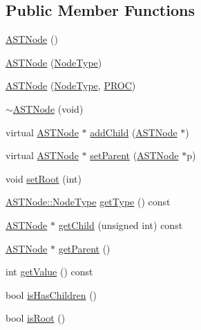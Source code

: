 \subsection*{Public Member Functions}
\begin{DoxyCompactItemize}
\item 
\hyperlink{class_a_s_t_node_a1196ed4f19c0b62cdc42fe35946b91d2}{A\-S\-T\-Node} ()
\item 
\hyperlink{class_a_s_t_node_a512c4363de4ceef82b6189e1dbd34ec1}{A\-S\-T\-Node} (\hyperlink{class_a_s_t_node_a4fd016b5f0e44ea6aca3542d27de3859}{Node\-Type})
\item 
\hyperlink{class_a_s_t_node_a97d3345ffb311a0582a8bf1478722a70}{A\-S\-T\-Node} (\hyperlink{class_a_s_t_node_a4fd016b5f0e44ea6aca3542d27de3859}{Node\-Type}, \hyperlink{std_afx_8h_aa07ea1d188c7b45668f1bd82ffd6d87e}{P\-R\-O\-C})
\item 
\hyperlink{class_a_s_t_node_a075d226c6382610b649193f72902faf7}{$\sim$\-A\-S\-T\-Node} (void)
\item 
virtual \hyperlink{class_a_s_t_node}{A\-S\-T\-Node} $\ast$ \hyperlink{class_a_s_t_node_a595fb15c3e37a7a9e443742dca6483ca}{add\-Child} (\hyperlink{class_a_s_t_node}{A\-S\-T\-Node} $\ast$)
\item 
virtual \hyperlink{class_a_s_t_node}{A\-S\-T\-Node} $\ast$ \hyperlink{class_a_s_t_node_a70e8aa10baa353684ae8288f3460a5fc}{set\-Parent} (\hyperlink{class_a_s_t_node}{A\-S\-T\-Node} $\ast$p)
\item 
void \hyperlink{class_a_s_t_node_a940adeca834d8d00d6d9fa70be68bc0f}{set\-Root} (int)
\item 
\hyperlink{class_a_s_t_node_a4fd016b5f0e44ea6aca3542d27de3859}{A\-S\-T\-Node\-::\-Node\-Type} \hyperlink{class_a_s_t_node_afa85380e2e00c7b3166d61ae696b8365}{get\-Type} () const 
\item 
\hyperlink{class_a_s_t_node}{A\-S\-T\-Node} $\ast$ \hyperlink{class_a_s_t_node_a68ef18e60e551c9ba047e3d1809d8620}{get\-Child} (unsigned int) const 
\item 
\hyperlink{class_a_s_t_node}{A\-S\-T\-Node} $\ast$ \hyperlink{class_a_s_t_node_a62e103d706cfbace82cf124bbd080c3e}{get\-Parent} ()
\item 
int \hyperlink{class_a_s_t_node_a899c8bb0314158fc8ca7d5688b89e165}{get\-Value} () const 
\item 
bool \hyperlink{class_a_s_t_node_ae26a0a4a3beebf3ef460ff603cbc3a97}{is\-Has\-Children} ()
\item 
bool \hyperlink{class_a_s_t_node_aba44d4dd6234cab7a2c3f153b65bd97f}{is\-Root} ()
\end{DoxyCompactItemize}
